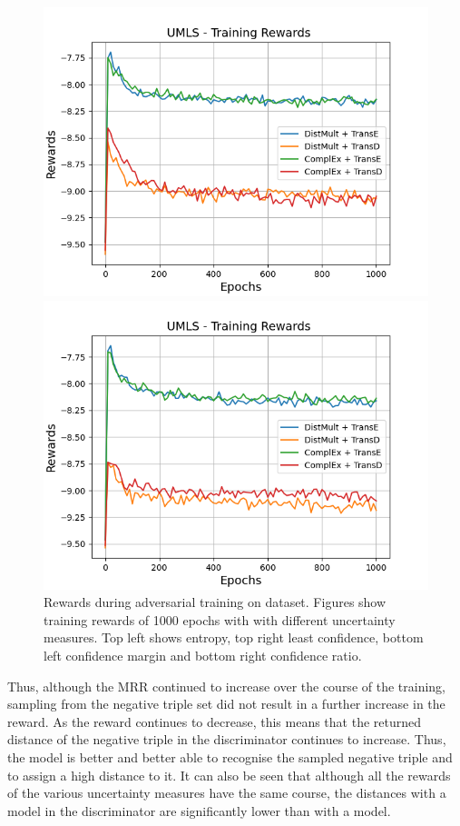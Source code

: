 \begin{figure}[H]
    \begin{minipage}{.5\textwidth}
      \centering
      \includegraphics[width=0.9\linewidth]{figures/results/gan_train/not_pretrained/uncertainty/max_distribution/confidence_margin/umls/uncertainty_umls_rew.png}
    \end{minipage}%
    \begin{minipage}{.5\textwidth}
      \centering
      \includegraphics[width=0.9\linewidth]{figures/results/gan_train/not_pretrained/uncertainty/max_distribution/confidence_ratio/umls/uncertainty_umls_rew.png}
    \end{minipage}%
    \caption{Rewards during adversarial training on \umls dataset. 
    Figures show training rewards of 1000 epochs with \ussoftmax with different uncertainty measures.
    Top left shows entropy, top right least confidence, 
    bottom left confidence margin and bottom right confidence ratio.}
    \label{fig:advtrain_metrics_umls_rew}
\end{figure}
Thus, although the MRR continued to increase over the course of the training, sampling from the negative triple set did not result in a further increase in the reward.
As the reward continues to decrease, this means that the returned distance of the negative triple in the discriminator continues to increase.
Thus, the model is better and better able to recognise the sampled negative triple and to assign a high distance to it.
It can also be seen that although all the rewards of the various uncertainty measures have the same course, the distances with a \transd model in the discriminator are significantly lower than with a \transe model.

